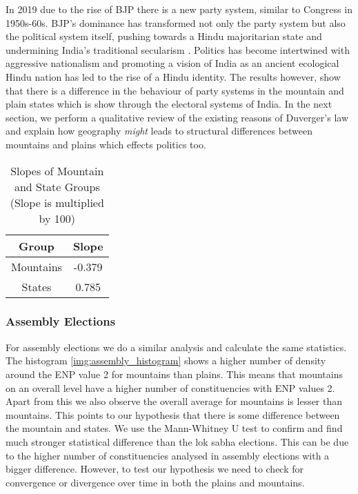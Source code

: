 \vspace{0.3cm}
In 2019 due to the rise of BJP there is a new party system, similar to Congress in 1950s-60s. BJP's dominance has transformed not only the party system but also the political system itself, pushing towards a Hindu majoritarian state and undermining India's traditional secularism \citep{jaffrelot2020bjp}.  Politics has become intertwined with aggressive nationalism and promoting a vision of India as an ancient ecological Hindu nation has led to the rise of a Hindu identity. The results however, show that there is a difference in the behaviour of party systems in the mountain and plain states which is show through the electoral systems of India. In the next section, we perform a qualitative review of the existing reasons of Duverger's law and explain how geography \textit{might} leads to structural differences between mountains and plains which effects politics too.


\begin{table}[h]
\centering
\begin{tabular}{|c|c|}
\hline
Group & Slope \\
\hline
Mountains & -0.379 \\
\hline
States & 0.785 \\
\hline
\end{tabular}
\caption{Slopes of Mountain and State Groups (Slope is multiplied by 100)}

\end{table}


\subsubsection{Assembly Elections}
For assembly elections we do a similar analysis and calculate the same statistics. The histogram \ref{img:assembly_histogram} shows a higher number of density around the ENP value 2 for mountains than plains. This means that mountains on an overall level have a higher number of constituencies with ENP values 2. Apart from this we also observe the overall average for mountains is lesser than mountains. This points to our hypothesis that there is some difference between the mountain and states. We use the Mann-Whitney U test to confirm and find much stronger statistical difference than the lok sabha elections. This can be due to the higher number of constituencies analysed in assembly elections with a bigger difference. However, to test our hypothesis we need to check for convergence or divergence over time in both the plains and mountains. 

